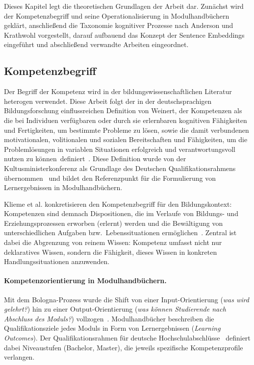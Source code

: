 
Dieses Kapitel legt die theoretischen Grundlagen der Arbeit dar.
Zunächst wird der Kompetenzbegriff und seine Operationalisierung in Modulhandbüchern geklärt, anschließend die Taxonomie kognitiver Prozesse nach Anderson und Krathwohl vorgestellt, darauf aufbauend das Konzept der Sentence Embeddings eingeführt und abschließend verwandte Arbeiten eingeordnet.

\subsection{Kompetenzbegriff}\label{sec:grundlagen-kompetenz}

Der Begriff der Kompetenz wird in der bildungswissenschaftlichen Literatur heterogen verwendet.
Diese Arbeit folgt der in der deutschsprachigen Bildungsforschung einflussreichen Definition von Weinert, der Kompetenzen als \glqq die bei Individuen verfügbaren oder durch sie erlernbaren kognitiven Fähigkeiten und Fertigkeiten, um bestimmte Probleme zu lösen, sowie die damit verbundenen motivationalen, volitionalen und sozialen Bereitschaften und Fähigkeiten, um die Problemlösungen in variablen Situationen erfolgreich und verantwortungsvoll nutzen zu können\grqq\ definiert~\cite{weinert2001leistungsmessung}.
Diese Definition wurde von der Kultusministerkonferenz als Grundlage des Deutschen Qualifikationsrahmens übernommen~\cite{dqr2013handbuch} und bildet den Referenzpunkt für die Formulierung von Lernergebnissen in Modulhandbüchern.

Klieme et al. konkretisieren den Kompetenzbegriff für den Bildungskontext: Kompetenzen sind demnach \glqq Dispositionen, die im Verlaufe von Bildungs- und Erziehungsprozessen erworben (erlernt) werden und die Bewältigung von unterschiedlichen Aufgaben bzw.\ Lebenssituationen ermöglichen\grqq~\cite{klieme2003bildungsstandards}.
Zentral ist dabei die Abgrenzung von reinem Wissen: Kompetenz umfasst nicht nur deklaratives Wissen, sondern die Fähigkeit, dieses Wissen in konkreten Handlungssituationen anzuwenden.

\paragraph{Kompetenzorientierung in Modulhandbüchern.}

Mit dem Bologna-Prozess wurde die Shift von einer Input-Orientierung (\emph{was wird gelehrt?}) hin zu einer Output-Orientierung (\emph{was können Studierende nach Abschluss des Moduls?}) vollzogen~\cite{hrknexus2015lernergebnisse}.
Modulhandbücher beschreiben die Qualifikationsziele jedes Moduls in Form von Lernergebnissen (\emph{Learning Outcomes}).
Der Qualifikationsrahmen für deutsche Hochschulabschlüsse~\cite{kmk2017qualifikationsrahmen} definiert dabei Niveaustufen (Bachelor, Master), die jeweils spezifische Kompetenzprofile verlangen.

